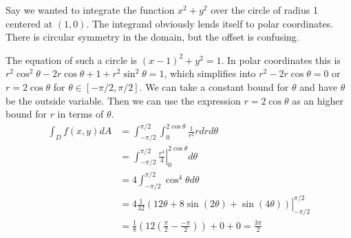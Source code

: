 \documentclass[fleqn,letterpaper]{report}
\begin{document}
\begin{example}
Say we wanted to integrate the function $x^2 + y^2$
over the circle of radius 1 centered at $(1,0)$. The
integrand obviously lends itself to polar coordinates. There
is circular symmetry in the domain, but the offset is
confusing.

The equation of such a circle is $(x-1)^2 + y^2 = 1$. In
polar coordinates this is $r^2 \cos^2 \theta - 2 r \cos
\theta + 1 + r^2 \sin^2 \theta =1$, which simplifies into $r^2
- 2r \cos \theta = 0$ or $r = 2 \cos \theta$ for $\theta \in
[-\pi/2, \pi/2]$. We can take a constant bound for $\theta$
and have $\theta$ be the outside variable. Then we can use the
expression $r = 2 \cos \theta$ as an higher bound for $r$ in
terms of $\theta$.
\begin{align*}
\int_D f(x,y) dA & = \int_{-\pi/2}^{\pi/2} \int_0^{2\cos
\theta} \frac{1}{r^2} r dr d\theta \\
& = \int_{-\pi/2}^{\pi/2} \left. \frac{r^4}{4} \right|_0^{2
\cos \theta} d \theta \\
& = 4 \int_{-\pi/2}^{\pi/2} \cos^4 \theta d \theta \\
& = 4 \left. \frac{1}{32} \left( 12 \theta + 8 \sin (2\theta) +
\sin (4\theta) \right) \right|_{-\pi/2}^{\pi/2} \\
& = \frac{1}{8} \left(12 \left( \frac{\pi}{2} - \frac{-\pi}{2}
\right) \right) + 0 + 0 = \frac{3\pi}{2} 
\end{align*}
\end{example}
\end{document}
